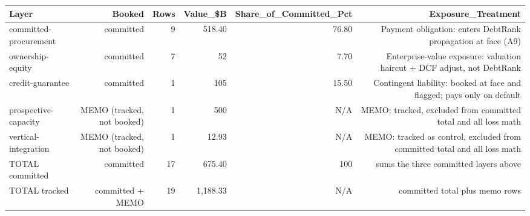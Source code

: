 

\begin{tabular}{@{}lrrrrr@{}}
\toprule
Layer & Booked & Rows & Value\_\$B & Share\_of\_Committed\_Pct & Exposure\_Treatment \\
\midrule
committed-procurement & committed & 9 & 518.40 & 76.80 & Payment obligation: enters DebtRank propagation at face (A9) \\
ownership-equity & committed & 7 & 52 & 7.70 & Enterprise-value exposure: valuation haircut + DCF adjust, not DebtRank \\
credit-guarantee & committed & 1 & 105 & 15.50 & Contingent liability: booked at face and flagged; pays only on default \\
prospective-capacity & MEMO (tracked, not booked) & 1 & 500 & N/A & MEMO: tracked, excluded from committed total and all loss math \\
vertical-integration & MEMO (tracked, not booked) & 1 & 12.93 & N/A & MEMO: tracked as control, excluded from committed total and all loss math \\
TOTAL committed & committed & 17 & 675.40 & 100 & sums the three committed layers above \\
TOTAL tracked & committed + MEMO & 19 & 1,188.33 & N/A & committed total plus memo rows \\
\bottomrule
\end{tabular}